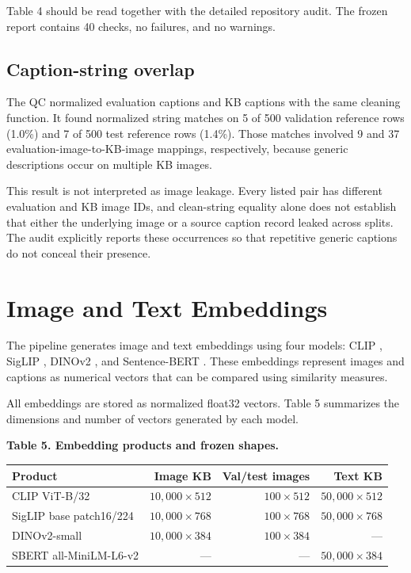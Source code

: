 \documentclass{article}
\begin{document}
Table 4 should be read together with the detailed repository audit. The
frozen report contains 40 checks, no failures, and no warnings.

\subsection{Caption-string overlap}\label{caption-string-overlap}

The QC normalized evaluation captions and KB captions with the same
cleaning function. It found normalized string matches on 5 of 500
validation reference rows (1.0\%) and 7 of 500 test reference rows
(1.4\%). Those matches involved 9 and 37 evaluation-image-to-KB-image
mappings, respectively, because generic descriptions occur on multiple
KB images.

This result is not interpreted as image leakage. Every listed pair has
different evaluation and KB image IDs, and clean-string equality alone
does not establish that either the underlying image or a source caption
record leaked across splits. The audit explicitly reports these
occurrences so that repetitive generic captions do not conceal their
presence.

\section{Image and Text Embeddings}\label{image-and-text-embeddings}

The pipeline generates image and text embeddings using four models:
CLIP \cite{radford_learning_2021}, SigLIP \cite{zhai_sigmoid_2023},
DINOv2 \cite{oquab_dinov2_2023}, and Sentence-BERT
\cite{reimers_sentence-bert_2019}. These embeddings represent
images and captions as numerical vectors that can be compared using
similarity measures.

All embeddings are stored as normalized float32 vectors. Table 5
summarizes the dimensions and number of vectors generated by each
model.

\begin{center}
\textbf{Table 5. Embedding products and frozen shapes.}
\end{center}

\begin{table}[htbp]
\centering
\begin{tabular}{lrrr}
\toprule
Product & Image KB & Val/test images & Text KB \\
\midrule
CLIP ViT-B/32 & \(10{,}000\times512\) & \(100\times512\) & \(50{,}000\times512\) \\
SigLIP base patch16/224 & \(10{,}000\times768\) & \(100\times768\) & \(50{,}000\times768\) \\
DINOv2-small & \(10{,}000\times384\) & \(100\times384\) & --- \\
SBERT all-MiniLM-L6-v2 & --- & --- & \(50{,}000\times384\) \\
\bottomrule
\end{tabular}
\end{table}
\end{document}
